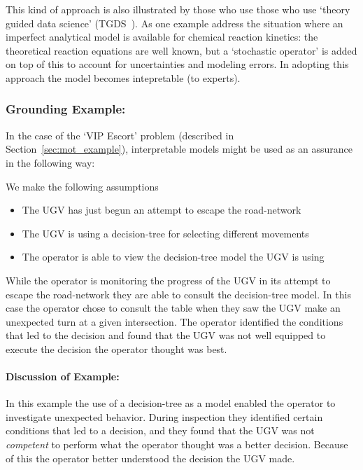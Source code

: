 This kind of approach is also illustrated by those who use those who use `theory guided data science' (TGDS~\cite{Kumar2016-yw,Faghmous2014-og}). As one example \citet{Morrison2016-fz} address the situation where an imperfect analytical model is available for chemical reaction kinetics: the theoretical reaction equations are well known, but a `stochastic operator' is added on top of this to account for uncertainties and modeling errors. In adopting this approach the model becomes intepretable (to experts).

\subsubsection{Grounding Example:}
In the case of the `VIP Escort' problem (described in Section~\ref{sec:mot_example}), interpretable models might be used as an assurance in the following way:

We make the following assumptions

\begin{itemize}
    \item The UGV has just begun an attempt to escape the road-network
    \item The UGV is using a decision-tree for selecting different movements
    \item The operator is able to view the decision-tree model the UGV is using
\end{itemize}

While the operator is monitoring the progress of the UGV in its attempt to escape the road-network they are able to consult the decision-tree model. In this case the operator chose to consult the table when they saw the UGV make an unexpected turn at a given intersection. The operator identified the conditions that led to the decision and found that the UGV was not well equipped to execute the decision the operator thought was best.
\paragraph{\textbf{Discussion of Example:}} In this example the use of a decision-tree as a model enabled the operator to investigate unexpected behavior. During inspection they identified certain conditions that led to a decision, and they found that the UGV was not \emph{competent} to perform what the operator thought was a better decision. Because of this the operator better understood the decision the UGV made.
